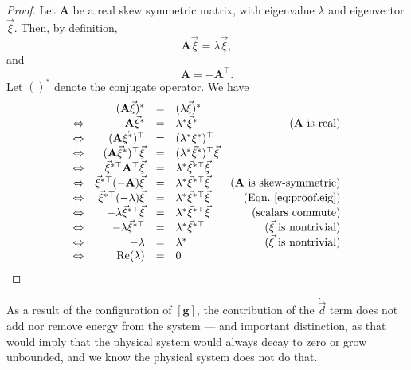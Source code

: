 \begin{proof}
Let $\mathbf{A}$ be a real skew symmetric matrix, with eigenvalue $\lambda$ and eigenvector $\vec\xi$. Then, by definition,
\begin{equation}
\mathbf{A}\vec\xi = \lambda\vec\xi,
\label{eq:proof.eig}
\end{equation}
and 
\begin{equation}
\mathbf{A} = -\mathbf{A}^\top.
\end{equation}
Let $()^*$ denote the conjugate operator. We have
\begin{equation}
\begin{array}{rrclr}
 & (\mathbf{A}\vec\xi)^* &=& (\lambda\vec\xi)^* & \\
\Leftrightarrow & \mathbf{A}\vec\xi^* &=& \lambda^*\vec\xi^* & (\mathbf{A}\text{ is real}) \\
\Leftrightarrow & (\mathbf{A}\vec\xi^*)^\top &=& (\lambda^*\vec\xi^*)^\top & \\
\Leftrightarrow & (\mathbf{A}\vec\xi^*)^\top\vec\xi &=& (\lambda^*\vec\xi^*)^\top\vec\xi & \\
\Leftrightarrow & \vec\xi^{*\top}\mathbf{A}^\top\vec\xi &=& \lambda^*\vec\xi^{*\top}\vec\xi & \\
\Leftrightarrow & \vec\xi^{*\top}(\mathbf{-A})\vec\xi &=& \lambda^*\vec\xi^{*\top}\vec\xi & (\mathbf{A}\text{ is skew-symmetric}) \\
\Leftrightarrow & \vec\xi^{*\top}(-\lambda)\vec\xi &=& \lambda^*\vec\xi^{*\top}\vec\xi & (\text{Eqn.~\ref{eq:proof.eig}}) \\
\Leftrightarrow & -\lambda\vec\xi^{*\top}\vec\xi &=& \lambda^*\vec\xi^{*\top}\vec\xi & (\text{scalars commute}) \\
\Leftrightarrow & -\lambda\vec\xi^{*\top} &=& \lambda^*\vec\xi^{*\top} & (\vec\xi\text{ is nontrivial})\\
\Leftrightarrow & -\lambda &=& \lambda^* & (\vec\xi\text{ is nontrivial})\\
\Leftrightarrow & \text{Re}(\lambda) &=& 0 & \\
\end{array}
\end{equation}
\end{proof}

As a result of the configuration of $\mathbf{[g]}$, the contribution of the $\dot{\vec d}$ term does not add nor remove energy from the system --- and important distinction, as that would imply that the physical system would always decay to zero or grow unbounded, and we know the physical system does not do that.

